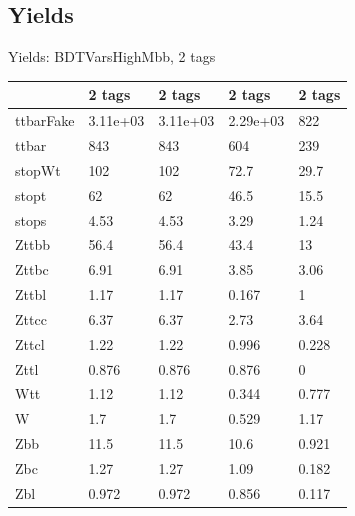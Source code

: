 
\subsection{Yields}

\begin{frame}{Yields: BDTVarsHighMbb, 2 tags}
\begin{center}
  \begin{tabular}{l| >{\centering\let\newline\\\arraybackslash\hspace{0pt}}m{1.4cm}| >{\centering\let\newline\\\arraybackslash\hspace{0pt}}m{1.4cm}| >{\centering\let\newline\\\arraybackslash\hspace{0pt}}m{1.4cm}| >{\centering\let\newline\\\arraybackslash\hspace{0pt}}m{1.4cm}}
    & 2 tags & 2 tags & 2 tags & 2 tags \\
 \hline \hline
    ttbarFake& 3.11e+03 & 3.11e+03 & 2.29e+03 & 822 \\
 \hline
    ttbar& 843 & 843 & 604 & 239 \\
 \hline
    stopWt& 102 & 102 & 72.7 & 29.7 \\
 \hline
    stopt& 62 & 62 & 46.5 & 15.5 \\
 \hline
    stops& 4.53 & 4.53 & 3.29 & 1.24 \\
 \hline
    Zttbb& 56.4 & 56.4 & 43.4 & 13 \\
 \hline
    Zttbc& 6.91 & 6.91 & 3.85 & 3.06 \\
 \hline
    Zttbl& 1.17 & 1.17 & 0.167 & 1 \\
 \hline
    Zttcc& 6.37 & 6.37 & 2.73 & 3.64 \\
 \hline
    Zttcl& 1.22 & 1.22 & 0.996 & 0.228 \\
 \hline
    Zttl& 0.876 & 0.876 & 0.876 & 0 \\
 \hline
    Wtt& 1.12 & 1.12 & 0.344 & 0.777 \\
 \hline
    W& 1.7 & 1.7 & 0.529 & 1.17 \\
 \hline
    Zbb& 11.5 & 11.5 & 10.6 & 0.921 \\
 \hline
    Zbc& 1.27 & 1.27 & 1.09 & 0.182 \\
 \hline
    Zbl& 0.972 & 0.972 & 0.856 & 0.117 \\

\end{tabular}
\end{center}
\end{frame}

